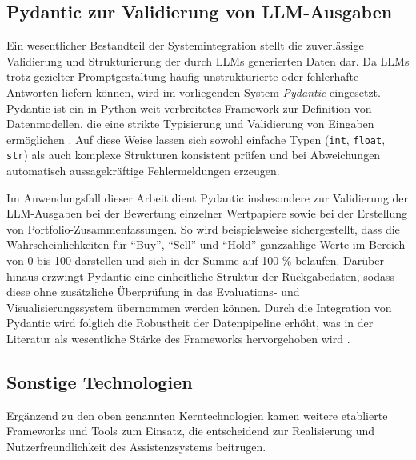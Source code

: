     \subsection{Pydantic zur Validierung von LLM-Ausgaben}
      \label{sec:pydantic}

      Ein wesentlicher Bestandteil der Systemintegration stellt die zuverlässige Validierung und Strukturierung der durch \acs{LLM}s generierten Daten dar.
      Da \acs{LLM}s trotz gezielter Promptgestaltung häufig unstrukturierte oder fehlerhafte Antworten liefern können, wird im vorliegenden System \textit{Pydantic} eingesetzt.
      Pydantic ist ein in Python weit verbreitetes Framework zur Definition von Datenmodellen, die eine strikte Typisierung und Validierung von Eingaben ermöglichen \autocite{pydantic_docs}.
      Auf diese Weise lassen sich sowohl einfache Typen (\texttt{int}, \texttt{float}, \texttt{str}) als auch komplexe Strukturen konsistent prüfen und bei Abweichungen automatisch aussagekräftige Fehlermeldungen erzeugen.

      Im Anwendungsfall dieser Arbeit dient Pydantic insbesondere zur Validierung der \acs{LLM}-Ausgaben bei der Bewertung einzelner Wertpapiere sowie bei der Erstellung von Portfolio-Zusammenfassungen.
      So wird beispielsweise sichergestellt, dass die Wahrscheinlichkeiten für \enquote{Buy}, \enquote{Sell} und \enquote{Hold} ganzzahlige Werte im Bereich von 0 bis 100 darstellen und sich in der Summe auf 100 \% belaufen.
      Darüber hinaus erzwingt Pydantic eine einheitliche Struktur der Rückgabedaten, sodass diese ohne zusätzliche Überprüfung in das Evaluations- und Visualisierungssystem übernommen werden können.
      Durch die Integration von Pydantic wird folglich die Robustheit der Datenpipeline erhöht, was in der Literatur als wesentliche Stärke des Frameworks hervorgehoben wird \autocite{pydantic_docs}.


    \subsection{Sonstige Technologien}


      Ergänzend zu den oben genannten Kerntechnologien kamen weitere etablierte Frameworks und Tools zum Einsatz, die entscheidend zur Realisierung und Nutzerfreundlichkeit des Assistenzsystems beitrugen.

